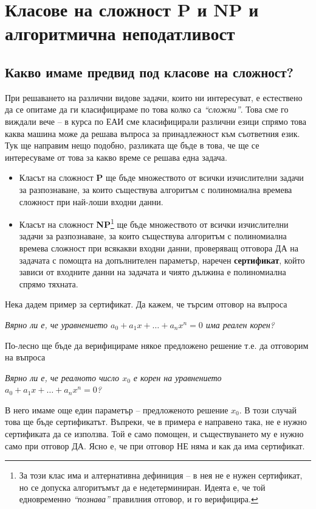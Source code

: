 
\chapter{Класове на сложност \textbf{P} и \textbf{NP} и алгоритмична неподатливост}

\section{Какво имаме предвид под класове на сложност?}

При решаването на различни видове задачи, които ни интересуват, е естествено да се опитаме да ги класифицираме по това колко са \textit{``сложни''}.
Това сме го виждали вече -- в курса по ЕАИ сме класифицирали различни езици спрямо това каква машина може да решава въпроса за принадлежност към съответния език.
Тук ще направим нещо подобно, разликата ще бъде в това, че ще се интересуваме от това за какво време се решава една задача.
\begin{itemize}
      \item Класът на сложност \textbf{P} ще бъде множеството от всички изчислителни задачи за разпознаване, за които съществува алгоритъм с полиномиална времева сложност при най-лоши входни данни.
      \item Класът на сложност \textbf{NP}\footnote{
                  За този клас има и алтернативна дефиниция -- в нея не е нужен сертификат, но се допуска алгоритъмът да е недетерминиран.
                  Идеята е, че той едновременно \textit{``познава''} правилния отговор, и го верифицира.
            } ще бъде множеството от всички изчислителни задачи за разпознаване, за които съществува алгоритъм с полиномиална времева сложност при всякакви входни данни, проверяващ отговора ДА на задачата с помощта на допълнителен параметър, наречен \textbf{сертификат}, който зависи от входните данни на задачата и чиято дължина е полиномиална спрямо тяхната.
\end{itemize}
Нека дадем пример за сертификат.
Да кажем, че търсим отговор на въпроса
\begin{center}
      \textit{Вярно ли е, че уравнението $a_0 + a_1 x + \dots + a_n x^n = 0$ има реален корен?}
\end{center}
По-лесно ще бъде да верифицираме някое предложено решение т.е. да отговорим на въпроса
\begin{center}
      \textit{Вярно ли е, че реалното число $x_0$ е корен на уравнението $a_0 + a_1 x + \dots + a_n x^n = 0$?}
\end{center}
В него имаме още един параметър -- предложеното решение $x_0$.
В този случай това ще бъде сертификатът.
Въпреки, че в примера е направено така, не е нужно сертификата да се използва.
Той е само помощен, и съществуването му е нужно само при отговор ДА.
Ясно е, че при отговор НЕ няма и как да има сертификат.

